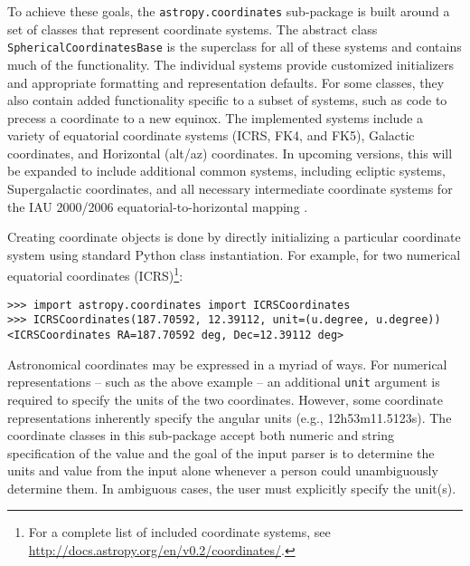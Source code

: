 \documentclass[traditabstract]{aa}
\begin{document}
To achieve these goals, the \texttt{astropy.coordinates} sub-package
is built around a set of classes that represent coordinate systems.
The abstract class \texttt{SphericalCoordinatesBase} is the superclass
for all of these systems and contains much of the functionality.  The
individual systems provide customized initializers and appropriate
formatting and representation defaults.  For some classes, they also
contain added functionality specific to a subset of systems, such as
code to precess a coordinate to a new equinox.  The implemented
systems include a variety of equatorial coordinate systems (ICRS, FK4,
and FK5), Galactic coordinates, and Horizontal (alt/az) coordinates.
In upcoming versions, this will be expanded to include additional
common systems, including ecliptic systems, Supergalactic coordinates,
and all necessary intermediate coordinate systems for the IAU
2000/2006 equatorial-to-horizontal mapping \citep[e.g.,][]{soffel03,
  usnocircular179}.


Creating coordinate objects is done by directly initializing a
particular coordinate system using standard Python class
instantiation. For example, for two numerical equatorial
coordinates (ICRS)\footnote{For a complete list of included coordinate
  systems, see \url{http://docs.astropy.org/en/v0.2/coordinates/}.}:

\begin{verbatim}
>>> import astropy.coordinates import ICRSCoordinates
>>> ICRSCoordinates(187.70592, 12.39112, unit=(u.degree, u.degree))
<ICRSCoordinates RA=187.70592 deg, Dec=12.39112 deg>
\end{verbatim}

Astronomical coordinates may be expressed in a myriad of ways. For
numerical representations -- such as the above example -- an
additional \texttt{unit} argument is required to specify the units of
the two coordinates. However, some coordinate representations
inherently specify the angular units (e.g., 12h53m11.5123s). The
coordinate classes in this sub-package accept both numeric and string
specification of the value and the goal of the input parser is to
determine the units and value from the input alone whenever a person
could unambiguously determine them. In ambiguous cases, the user must
explicitly specify the unit(s).

\end{document}
